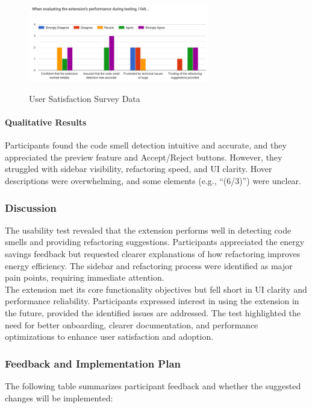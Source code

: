 \documentclass[12pt, titlepage]{article}
\begin{document}
\begin{figure}[H]
  \centering
  \includegraphics[width=0.7\textwidth]{../Images/usability-satisfaction-graph.png}
  \label{img:usability-satisfaction}
  \caption{User Satisfaction Survey Data}
\end{figure}

\paragraph{Qualitative Results}
Participants found the code smell detection intuitive and accurate,
and they appreciated the preview feature and Accept/Reject buttons.
However, they struggled with sidebar visibility, refactoring speed,
and UI clarity. Hover descriptions were overwhelming, and some
elements (e.g., ``(6/3)'') were unclear.

\subsubsection{Discussion}
The usability test revealed that the extension performs well in
detecting code smells and providing refactoring suggestions.
Participants appreciated the energy savings feedback but requested
clearer explanations of how refactoring improves energy efficiency.
The sidebar and refactoring process were identified as major pain
points, requiring immediate attention.\\

The extension met its core functionality objectives but fell short in
UI clarity and performance reliability. Participants expressed
interest in using the extension in the future, provided the
identified issues are addressed. The test highlighted the need for
better onboarding, clearer documentation, and performance
optimizations to enhance user satisfaction and adoption.

\subsubsection{Feedback and Implementation Plan}
The following table summarizes participant feedback and whether the
suggested changes will be implemented:
\end{document}
